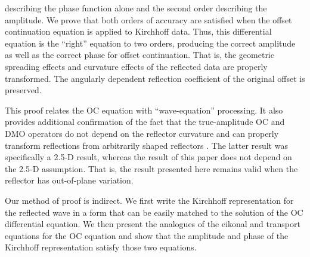 describing the phase function alone and the second order describing
the amplitude.  We prove that both orders of accuracy are satisfied
when the offset continuation equation is applied to Kirchhoff data.
Thus, this differential equation is the ``right'' equation to two
orders, producing the correct amplitude as well as the correct phase
for offset continuation.  That is, the geometric spreading effects and
curvature effects of the reflected data are properly transformed.  The
angularly dependent reflection coefficient of the original offset is
preserved.  \par This proof relates the OC equation with
``wave-equation'' processing.  It also provides additional
confirmation of the fact that the true-amplitude OC and DMO operators
\cite[]{GEO58-01-00470066,joint,santos,GEO63-02-05570573} do not
depend on the reflector curvature and can properly transform
reflections from arbitrarily shaped reflectors
\cite[]{Goldin.sep.67.171,GEO61-03-07590775,cwp}.  The latter result
was specifically a 2.5-D result, whereas the result of this paper does
not depend on the 2.5-D assumption.  That is, the result presented
here remains valid when the reflector has out-of-plane variation.
\par Our method of proof is indirect.  We first write the Kirchhoff
representation for the reflected wave in a form that can be easily
matched to the solution of the OC differential equation.  We then
present the analogues of the eikonal and transport equations for the
OC equation and show that the amplitude and phase of the Kirchhoff
representation satisfy those two equations.

